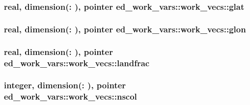\subsubsection[{glat}]{\setlength{\rightskip}{0pt plus 5cm}real, dimension(\+:  ), pointer ed\+\_\+work\+\_\+vars\+::work\+\_\+vecs\+::glat}\label{structed__work__vars_1_1work__vecs_a957e7ab559f48443828e710632887d48}
\hypertarget{structed__work__vars_1_1work__vecs_abee061861a4c4f6dfbc1bc8ec18a463b}{}
\subsubsection[{glon}]{\setlength{\rightskip}{0pt plus 5cm}real, dimension(\+:  ), pointer ed\+\_\+work\+\_\+vars\+::work\+\_\+vecs\+::glon}\label{structed__work__vars_1_1work__vecs_abee061861a4c4f6dfbc1bc8ec18a463b}
\hypertarget{structed__work__vars_1_1work__vecs_a706bea04b2f0bd207bb88b24151b31f3}{}
\subsubsection[{landfrac}]{\setlength{\rightskip}{0pt plus 5cm}real, dimension(\+:  ), pointer ed\+\_\+work\+\_\+vars\+::work\+\_\+vecs\+::landfrac}\label{structed__work__vars_1_1work__vecs_a706bea04b2f0bd207bb88b24151b31f3}
\hypertarget{structed__work__vars_1_1work__vecs_abcd125ac3a76abc44387395c1746d25b}{}
\subsubsection[{nscol}]{\setlength{\rightskip}{0pt plus 5cm}integer, dimension(\+:  ), pointer ed\+\_\+work\+\_\+vars\+::work\+\_\+vecs\+::nscol}\label{structed__work__vars_1_1work__vecs_abcd125ac3a76abc44387395c1746d25b}
\hypertarget{structed__work__vars_1_1work__vecs_a898272bb541b0bd262ff3efe1a0f919d}{}
